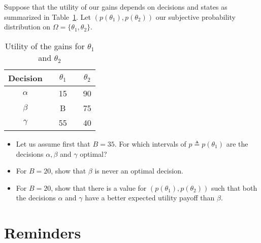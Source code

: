 \documentclass{../ape}
\begin{document}
\section{}
Suppose that the utility of our gains depends on decisions and states as summarized in Table~\ref{ex7}. Let $(p(\theta_1), p(\theta_2))$ our subjective probability distribution on $\Omega = \{ \theta_1, \theta_2 \}$.
\begin{table}[h!]
	\begin{center}
		\begin{tabular}{ccccc}
			\hline
			Decision & & $\theta_1$ & & $\theta_2$ \\
			\hline
			$\alpha$ & & 15 & & 90 \\
			$\beta$ & & B & & 75 \\
			$\gamma$ & & 55 & & 40 \\
			\hline
		\end{tabular}
		\caption{Utility of the gains for $\theta_1$ and $\theta_2$} \label{ex7}
	\end{center}
\end{table}
\begin{itemize}
	\item Let us assume first that $B = 35$. For which intervals of $p \triangleq p(\theta_1)$ are the decisions $\alpha, \beta$ and $\gamma$ optimal? %
	\item For $B = 20$, show that $\beta$ is never an optimal decision.
	\item For $B = 20$, show that there is a value for $(p(\theta_1), p(\theta_2))$ such that  both the decisions $\alpha$ and $\gamma$ have a better expected utility payoff than  $\beta$.
\end{itemize}

\section*{Reminders}
\end{document}
